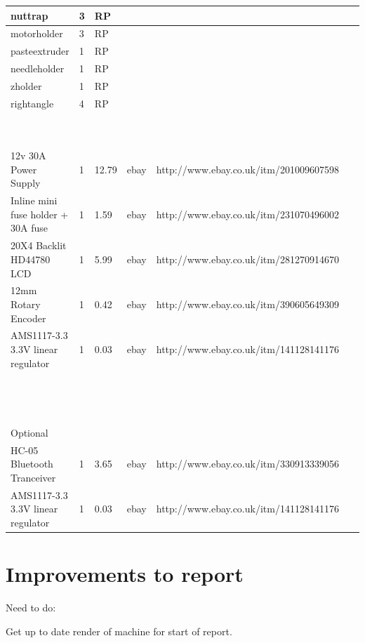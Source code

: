\begin{tabular}{ | l | l | l | l | l | l | }
	nuttrap & 3 & RP & \  & \  & \  \\ \hline
	motorholder & 3 & RP & \  & \  & \  \\ \hline
	pasteextruder & 1 & RP & \  & \  & \  \\ \hline
	needleholder & 1 & RP & \  & \  & \  \\ \hline
	zholder & 1 & RP & \  & \  & \  \\ \hline
	rightangle & 4 & RP & \  & \  & \  \\ \hline
	 &  & \  & \  & \  & \  \\ \hline
	 &  & \  & \  & \  & \  \\ \hline
	12v 30A Power Supply & 1 & 12.79 & ebay & http://www.ebay.co.uk/itm/201009607598 & \  \\ \hline
	Inline mini fuse holder + 30A fuse & 1 & 1.59 & ebay & http://www.ebay.co.uk/itm/231070496002 & \  \\ \hline
	20X4 Backlit HD44780 LCD & 1 & 5.99 & ebay & http://www.ebay.co.uk/itm/281270914670 & \  \\ \hline
	12mm Rotary Encoder & 1 & 0.42 & ebay & http://www.ebay.co.uk/itm/390605649309 & \  \\ \hline
	AMS1117-3.3 3.3V linear regulator & 1 & 0.03 & ebay & http://www.ebay.co.uk/itm/141128141176 & \  \\ \hline
	\  & \  & \  & \  & \  & \  \\ \hline
	\  & \  & \  & \  & \  & \  \\ \hline
	\  & \  & \  & \  & \  & \  \\ \hline
	Optional & \  & \  & \  & \  & \  \\ \hline
	HC-05 Bluetooth Tranceiver & 1 & 3.65 & ebay & http://www.ebay.co.uk/itm/330913339056 & \  \\ \hline
	AMS1117-3.3 3.3V linear regulator & 1 & 0.03 & ebay & http://www.ebay.co.uk/itm/141128141176 & \  \\ \hline
\end{tabular}



\newpage
\section{Improvements to report}
Need to do:

Get up to date render of machine for start of report.

\printglossaries

\nocite{*}
\printbibliography


